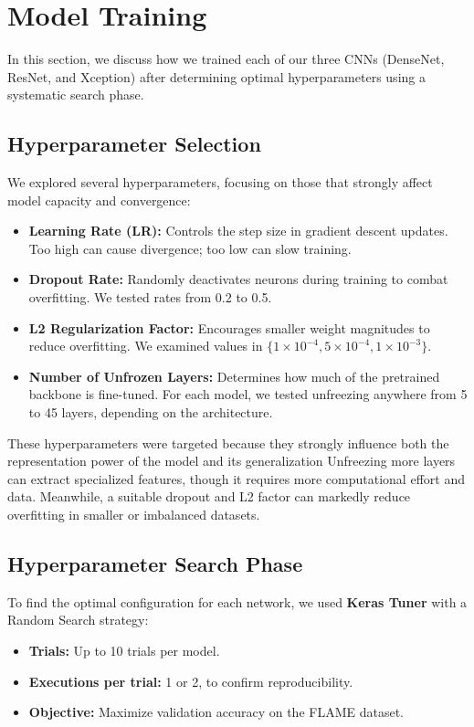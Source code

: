 \section{Model Training}
\label{sec:model-training}

In this section, we discuss how we trained each of our three CNNs (DenseNet, ResNet,
and Xception) after determining optimal hyperparameters using a systematic search phase.

\subsection{Hyperparameter Selection}
\label{subsec:hyperparameter-selection}

We explored several hyperparameters, focusing on those that strongly affect model capacity
and convergence:

\begin{itemize}
    \item \textbf{Learning Rate (LR):} Controls the step size in gradient descent updates.
    Too high can cause divergence; too low can slow training.
    \item \textbf{Dropout Rate:} Randomly deactivates neurons during training to combat
    overfitting. We tested rates from 0.2 to 0.5.
    \item \textbf{L2 Regularization Factor:} Encourages smaller weight magnitudes to reduce
    overfitting. We examined values in \(\{1 \times 10^{-4}, 5 \times 10^{-4}, 1 \times 10^{-3}\}\).
    \item \textbf{Number of Unfrozen Layers:} Determines how much of the pretrained backbone
    is fine-tuned. For each model, we tested unfreezing anywhere from 5 to 45 layers, depending
    on the architecture.
\end{itemize}

These hyperparameters were targeted because they strongly influence both the representation
power of the model and its generalization
Unfreezing more layers can extract specialized features, though it requires more computational effort and data.
Meanwhile, a suitable dropout and L2 factor can markedly reduce overfitting in smaller or imbalanced datasets.

\subsection{Hyperparameter Search Phase}
\label{subsec:hyperparameter-search-phase}

To find the optimal configuration for each network, we used \textbf{Keras Tuner} with
a Random Search strategy:
\begin{itemize}
    \item \textbf{Trials:} Up to 10 trials per model.
    \item \textbf{Executions per trial:} 1 or 2, to confirm reproducibility.
    \item \textbf{Objective:} Maximize validation accuracy on the FLAME dataset.
\end{itemize}

